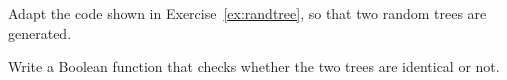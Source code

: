 Adapt the code shown in Exercise~\ref{ex:randtree}, so that two random trees are generated.
\begin{exercise}
Write a Boolean function that checks whether the two trees are identical or not.
\end{exercise}
